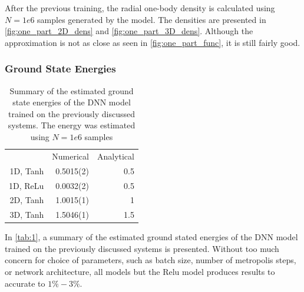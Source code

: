 After the previous training, the radial one-body density is calculated using $N=1e6$ samples generated by the model. The densities are presented in \autoref{fig:one_part_2D_dens} and \autoref{fig:one_part_3D_dens}. Although the approximation is not as close as seen in \autoref{fig:one_part_func}, it is still fairly good. 

\subsubsection{Ground State Energies}

\begin{table}[ht]
	\begin{tabular}{r|rr}
		\toprule
		           & Numerical & Analytical \\
		1D, Tanh   & 0.5015(2) &   0.5      \\
		1D, ReLu   & 0.0032(2) &   0.5      \\
		2D, Tanh   & 1.0015(1) &   1        \\
		3D, Tanh   & 1.5046(1) &   1.5      \\
		\bottomrule
	\end{tabular}
	\caption{Summary of the estimated ground state energies of the DNN model trained on the previously discussed systems. The energy was estimated using $N=1e6$ samples}
	\label{tab:1}
\end{table}

In \autoref{tab:1}, a summary of the estimated ground stated energies of the DNN model trained on the previously discussed systems is presented. Without too much concern for choice of parameters, such as batch size, number of metropolis steps, or network architecture, all models but the Relu model produces results to accurate to $1\%-3\%$.


